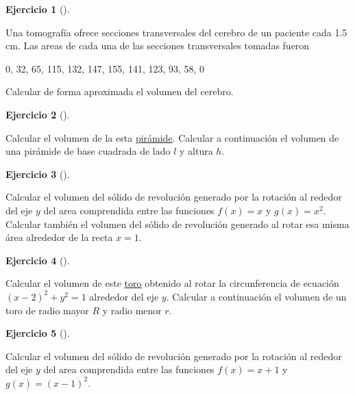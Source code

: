 \documentclass[
  a4paper,
]{scrreport}
\theoremstyle{definition}
\newtheorem{exercise}{Ejercicio}[chapter]
\theoremstyle{remark}
\begin{document}
\begin{exercise}[]\protect\hypertarget{exr-tomografía}{}\label{exr-tomografía}

Una tomografía ofrece secciones transversales del cerebro de un paciente
cada 1.5 cm. Las areas de cada una de las secciones transversales
tomadas fueron

0, 32, 65, 115, 132, 147, 155, 141, 123, 93, 58, 0

Calcular de forma aproximada el volumen del cerebro.

\end{exercise}

\begin{exercise}[]\protect\hypertarget{exr-volumen-piramide}{}\label{exr-volumen-piramide}

Calcular el volumen de la esta
\href{https://www.geogebra.org/m/g2wu3tqw}{pirámide}. Calcular a
continuación el volumen de una pirámide de base cuadrada de lado \(l\) y
altura \(h\).

\end{exercise}

\begin{exercise}[]\protect\hypertarget{exr-volumen-revolucion}{}\label{exr-volumen-revolucion}

Calcular el volumen del sólido de revolución generado por la rotación al
rededor del eje \(y\) del area comprendida entre las funciones
\(f(x)=x\) y \(g(x)=x^2\). Calcular también el volumen del sólido de
revolución generado al rotar esa misma área alrededor de la recta
\(x=1\).

\end{exercise}

\begin{exercise}[]\protect\hypertarget{exr-volumen-toro}{}\label{exr-volumen-toro}

Calcular el volumen de este
\href{https://www.geogebra.org/m/wy2uquqc}{toro} obtenido al rotar la
circunferencia de ecuación \((x-2)^2+y^2=1\) alrededor del eje \(y\).
Calcular a continuación el volumen de un toro de radio mayor \(R\) y
radio menor \(r\).

\end{exercise}

\begin{exercise}[]\protect\hypertarget{exr-volumen-revolucion-2}{}\label{exr-volumen-revolucion-2}

Calcular el volumen del sólido de revolución generado por la rotación al
rededor del eje \(y\) del area comprendida entre las funciones
\(f(x)=x+1\) y \(g(x)=(x-1)^2\).

\end{exercise}
\end{document}
